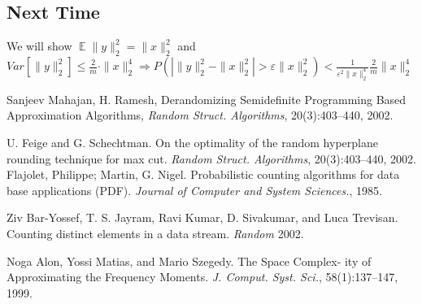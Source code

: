 \documentclass[11pt]{article}
\newcommand{\eps}{\epsilon}
\renewcommand{\epsilon}{\varepsilon}
\newcommand{\<}{\langle}
\renewcommand{\>}{\rangle}
\theoremstyle{definition}
\numberwithin{problem}{section}
\DeclareMathOperator*{\E}{\mathbb{E}}
\begin{document}
    \subsection{Next Time}
    We will show $\E \|y\|_2^2 = \|x\|_2^2$ and $Var[\|y\|_2^2] \leq \frac{2}{m} \cdot \|x\|_2^4 \Rightarrow P(|\|y\|_2^2 - \|x\|_2^2| > \eps \|x\|_2^2) < \frac{1}{\eps^2\|x\|_2^4}\frac{2}{m}\|x\|_2^4$
\begin{thebibliography}{42}
Sanjeev Mahajan, H. Ramesh, Derandomizing Semidefinite
Programming Based Approximation Algorithms, \textit{Random
Struct. Algorithms}, 20(3):403–440, 2002.

U. Feige and G. Schechtman. On the optimality of the random hyperplane rounding technique
for max cut. \textit{Random Struct. Algorithms}, 20(3):403–440, 2002.
Flajolet, Philippe; Martin, G. Nigel. Probabilistic counting algorithms for data base applications (PDF). \textit{Journal of Computer and System Sciences.}, 1985.

Ziv Bar-Yossef, T. S. Jayram, Ravi Kumar, D. Sivakumar, and Luca Trevisan. Counting distinct elements in a data stream. \textit{Random} 2002.

Noga Alon, Yossi Matias, and Mario Szegedy. The Space Complex- ity of Approximating the Frequency Moments. \textit{J. Comput. Syst. Sci.}, 58(1):137–147, 1999.
\end{thebibliography}
\end{document}
